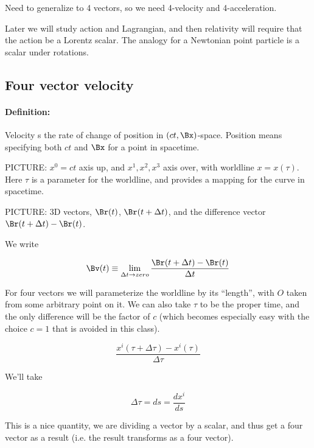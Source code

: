 Need to generalize to 4 vectors, so we need 4-velocity and 4-acceleration.

Later we will study action and Lagrangian, and then relativity will require that the action be a Lorentz scalar.  The analogy for a Newtonian point particle is a scalar under rotations.

\subsection{Four vector velocity}

\paragraph{Definition:} Velocity s the rate of change of position in $(ct, \Bx)$-space.  Position means specifying both $ct$ and $\Bx$ for a point in spacetime.

PICTURE: $x^0 = ct$ axis up, and $x^1, x^2, x^3$ axis over, with worldline $x = x(\tau)$.  Here $\tau$ is a parameter for the worldline, and provides a mapping for the curve in spacetime.

PICTURE: 3D vectors, $\Br(t)$, $\Br(t + \Delta t)$, and the difference vector $\Br(t + \Delta t) - \Br(t)$.

We write

\begin{equation}\label{eqn:relativisticElectrodynamicsL7:40}
\Bv(t) \equiv \lim_{\Delta t \rightarrow zero} \frac{\Br(t + \Delta t) - \Br(t)}{ \Delta t}
\end{equation}

For four vectors we will parameterize the worldline by its ``length'', with $O$ taken from some arbitrary point on it.  We can also take $\tau$ to be the proper time, and the only difference will be the factor of $c$ (which becomes especially easy with the choice $c=1$ that is avoided in this class).

\begin{equation}\label{eqn:relativisticElectrodynamicsL7:50}
\frac{x^i(\tau + \Delta \tau) - x^i(\tau)}{\Delta \tau}
\end{equation}

We'll take

\begin{equation}\label{eqn:relativisticElectrodynamicsL7:60}
\Delta \tau = ds = \frac{dx^i}{ds}
\end{equation}

This is a nice quantity, we are dividing a vector by a scalar, and thus get a four vector as a result (i.e. the result transforms as a four vector).

